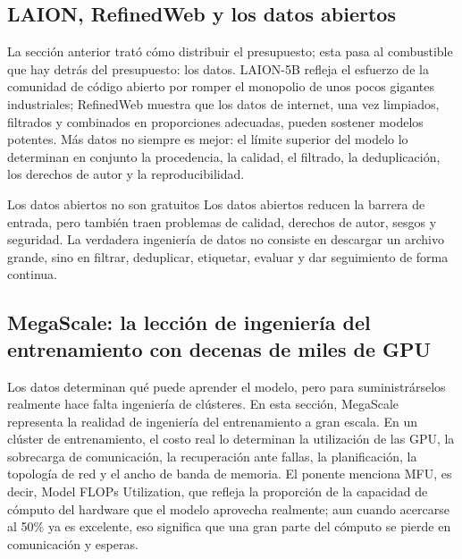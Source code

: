 \documentclass[a4paper]{article}
\begin{document}
\subsection{LAION, RefinedWeb y los datos abiertos}

La sección anterior trató cómo distribuir el presupuesto; esta pasa al combustible que hay detrás del presupuesto: los datos. LAION-5B refleja el esfuerzo de la comunidad de código abierto por romper el monopolio de unos pocos gigantes industriales; RefinedWeb muestra que los datos de internet, una vez limpiados, filtrados y combinados en proporciones adecuadas, pueden sostener modelos potentes. Más datos no siempre es mejor: el límite superior del modelo lo determinan en conjunto la procedencia, la calidad, el filtrado, la deduplicación, los derechos de autor y la reproducibilidad.

\begin{warningbox}{Los datos abiertos no son gratuitos}
Los datos abiertos reducen la barrera de entrada, pero también traen problemas de calidad, derechos de autor, sesgos y seguridad. La verdadera ingeniería de datos no consiste en descargar un archivo grande, sino en filtrar, deduplicar, etiquetar, evaluar y dar seguimiento de forma continua.
\end{warningbox}

\subsection{MegaScale: la lección de ingeniería del entrenamiento con decenas de miles de GPU}

Los datos determinan qué puede aprender el modelo, pero para suministrárselos realmente hace falta ingeniería de clústeres. En esta sección, MegaScale representa la realidad de ingeniería del entrenamiento a gran escala. En un clúster de entrenamiento, el costo real lo determinan la utilización de las GPU, la sobrecarga de comunicación, la recuperación ante fallas, la planificación, la topología de red y el ancho de banda de memoria. El ponente menciona MFU, es decir, Model FLOPs Utilization, que refleja la proporción de la capacidad de cómputo del hardware que el modelo aprovecha realmente; aun cuando acercarse al 50\% ya es excelente, eso significa que una gran parte del cómputo se pierde en comunicación y esperas.
\end{document}
